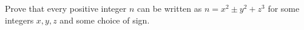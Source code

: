 Prove that every positive integer $n$ can be written as $n=x^2\pm y^2+z^3$ for some integers $x,y,z$ and some choice of sign.
